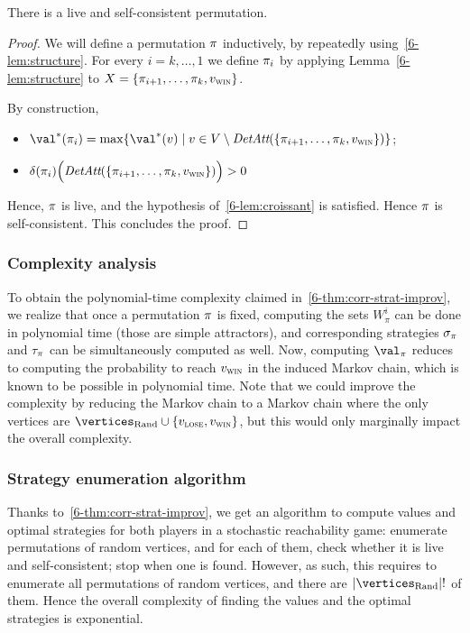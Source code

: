 \begin{lemma}
  \label{stoch:lemma-existence}
  There is a live and self-consistent permutation.
\end{lemma}

\begin{proof}
  We will define a permutation $\pi$ inductively, by repeatedly
  using~\cref{6-lem:structure}.  For every $i =k, \ldots
  ,1$ we define $\pi_i$ by applying
  Lemma~\cref{6-lem:structure} to $X =
  \{\pi_{i+1},\ldots,\pi_k,v_{\textsc{win}}\}$.

  By construction,
  \begin{itemize}
  \item $\val^*(\perm_i) = \max \{\val^*(v) \mid v \in V \setminus
    \DetAtt(\{\perm_{i+1},\ldots,\perm_k,\vwin\})\}$;
  \item     $\delta(\pi_i)\Big(\textit{DetAtt}(\{\pi_{i+1},\ldots,\pi_k,v_{\textsc{win}}\})\Big)
    >0$
  \end{itemize}
  Hence, $\pi$ is live, and the hypothesis of~\cref{6-lem:croissant} is satisfied. Hence $\pi$ is
  self-consistent. This concludes the proof.
\end{proof}

\subsubsection{Complexity analysis}

To obtain the polynomial-time complexity claimed in~\cref{6-thm:corr-strat-improv}, we realize that once a
permutation $\pi$ is fixed, computing the sets $W_\pi^i$ can be done
in polynomial time (those are simple attractors), and corresponding
strategies $\sigma_\pi$ and $\tau_\pi$ can be simultaneously
computed as well. Now, computing $\val_\perm$ reduces to computing the
probability to reach $v_{\textsc{win}}$ in the induced Markov chain, which is
known to be possible in polynomial time. Note that we could improve
the complexity by reducing the Markov chain to a Markov chain where
the only vertices are $\Randomvertices \cup \{\vlose,\vwin\}$, but
this would only marginally impact the overall complexity.

\subsubsection{Strategy enumeration algorithm}
\label{6-subsubsec:last}

Thanks to~\cref{6-thm:corr-strat-improv}, we get an algorithm
to compute values and optimal strategies for both players in a
stochastic reachability game: enumerate permutations of random
vertices, and for each of them, check whether it is live and
self-consistent; stop when one is found.
%
However, as such, this requires to enumerate all permutations of
random vertices, and there are $|\Randomvertices|!$ of them. Hence the
overall complexity of finding the values and the optimal strategies is
exponential.



